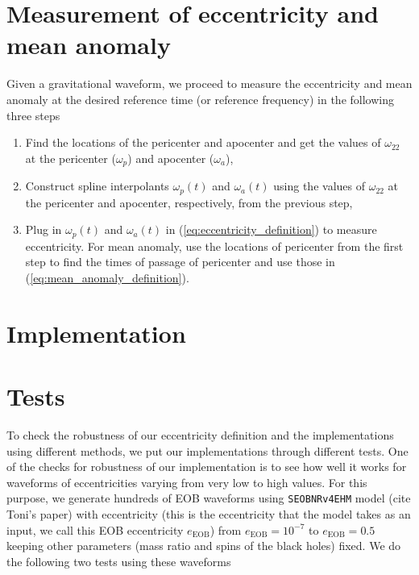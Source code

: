 \documentclass[aps,prd,amsmath,floats,floatfix, twocolumn,
superscriptaddress,nofootinbib,showpacs]{revtex4-1}
\begin{document}
\section{Measurement of eccentricity and mean anomaly}
\label{sec:measurement-of-eccentricity-and-mean-anomaly}
Given a gravitational waveform, we proceed to measure the eccentricity and mean anomaly at the desired reference time (or reference frequency) in the following three steps
\begin{enumerate}
\item Find the locations of the pericenter and apocenter and get the values of $\omega_{22}$ at the pericenter ($\omega_p$) and apocenter ($\omega_a$),
\item Construct spline interpolants $\omega_p(t)$ and $\omega_a(t)$ using the values of $\omega_{22}$ at the pericenter and apocenter, respectively, from the previous step,
\item Plug in $\omega_p(t)$ and $\omega_a(t)$ in (\ref{eq:eccentricity_definition}) to measure eccentricity. For mean anomaly, use the locations of pericenter from the first step to find the times of
  passage of pericenter and use those in (\ref{eq:mean_anomaly_definition}).
\end{enumerate}

\section{Implementation}
\label{sec:implementation}


\section{Tests}
\label{sec:tests}
To check the robustness of our eccentricity definition and the implementations using different methods, we put our implementations
through different tests. One of the checks for robustness of our implementation is to see how well it works for waveforms of eccentricities
varying from very low to high values. For this purpose, we generate hundreds of EOB waveforms using \texttt{SEOBNRv4EHM} model (cite Toni's paper) with eccentricity
(this is the eccentricity that the model takes as an input, we call this EOB eccentricity $e_{\text{EOB}}$) from $e_{\text{EOB}} = 10^{-7}$ to $e_{\text{EOB}} = 0.5$ keeping
other parameters (mass ratio and spins of the black holes) fixed. We do the following two tests using these waveforms
\end{document}

